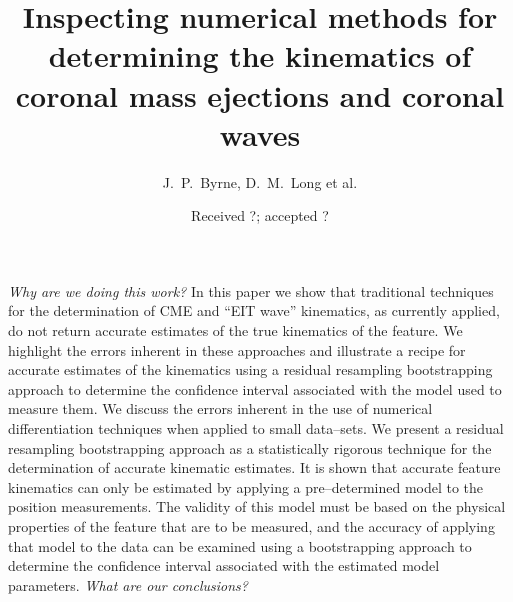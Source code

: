 \documentclass[structabstract]{aa}
\begin{document}
\title{Inspecting numerical methods for determining the kinematics of coronal mass ejections and coronal waves}


\author{J.~P.~Byrne,
	 D.~M.~Long
et al.} %

\date{Received ?; accepted ?}
\abstract
{\emph{Why are we doing this work?} }
{In this paper we show that traditional techniques for the determination of CME and ``EIT wave'' kinematics, as currently applied, do not return accurate estimates of the true kinematics of the feature. We highlight the errors inherent in these approaches and illustrate a recipe for accurate estimates of the kinematics using a residual resampling bootstrapping approach to determine the confidence interval associated with the model used to measure them.}
{We discuss the errors inherent in the use of numerical differentiation techniques when applied to small data--sets. We present a residual resampling bootstrapping approach as a statistically rigorous technique for the determination of accurate kinematic estimates.}
{It is shown that accurate feature kinematics can only be estimated by applying a pre--determined model to the position measurements. The validity of this model must be based on the physical properties of the feature that are to be measured, and the accuracy of applying that model to the data can be examined using a bootstrapping approach to determine the confidence interval associated with the estimated model parameters.}
{\emph{What are our conclusions?}}


\end{document}
